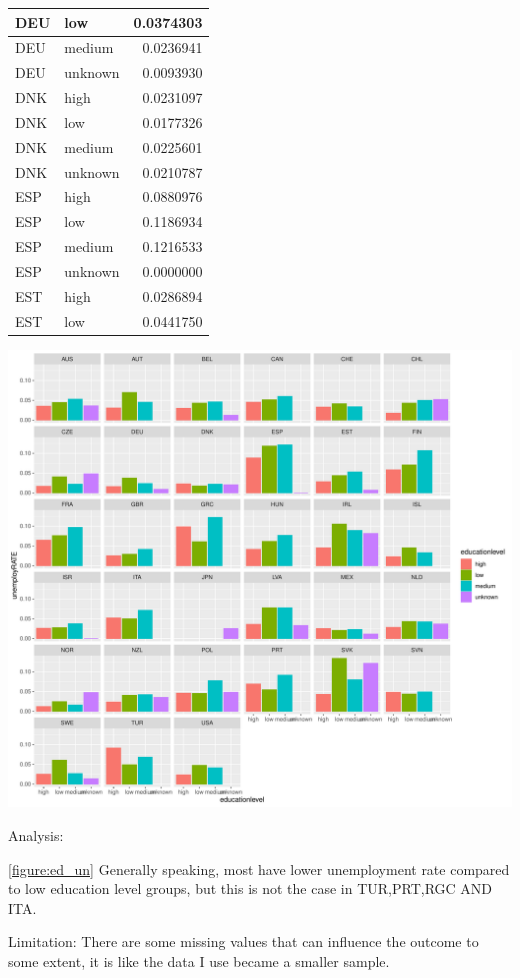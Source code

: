 \documentclass[11pt,a4paper,]{article}
\let\origfigure\figure
\let\endorigfigure\endfigure
\renewenvironment{figure}[1][2] {
    \expandafter\origfigure\expandafter[H]
} {
    \endorigfigure
}%
\begin{document}
\begin{table}
\begin{tabular}[t]{l|l|r}
\hline
DEU & low & 0.0374303\\
\hline
DEU & medium & 0.0236941\\
\hline
DEU & unknown & 0.0093930\\
\hline
DNK & high & 0.0231097\\
\hline
DNK & low & 0.0177326\\
\hline
DNK & medium & 0.0225601\\
\hline
DNK & unknown & 0.0210787\\
\hline
ESP & high & 0.0880976\\
\hline
ESP & low & 0.1186934\\
\hline
ESP & medium & 0.1216533\\
\hline
ESP & unknown & 0.0000000\\
\hline
EST & high & 0.0286894\\
\hline
EST & low & 0.0441750\\
\hline
\end{tabular}
\end{table}

\pagebreak

\begin{figure}
\centering
\includegraphics{ETC5513assignment4_files/figure-latex/ed_un-1.pdf}
\caption{(\#fig:ed\_un)unemployment rate among different education level}
\end{figure}

Analysis:

\ref{figure:ed_un} Generally speaking, most have lower unemployment rate compared to low education level groups, but this is not the case in TUR,PRT,RGC AND ITA.

Limitation:
There are some missing values that can influence the outcome to some extent, it is like the data I use became a smaller sample.

\nocite{*}

\printbibliography
\end{document}
